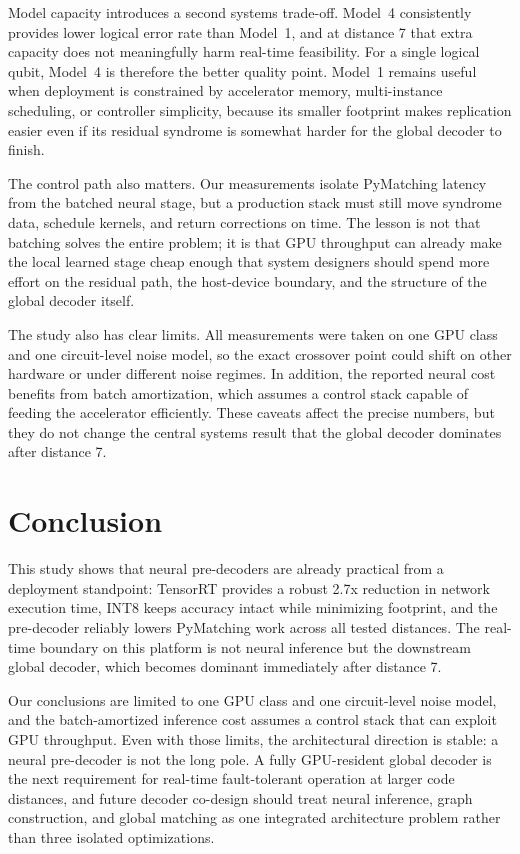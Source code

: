 \documentclass[journal]{IEEEtran}
\begin{document}
Model capacity introduces a second systems trade-off. Model~4 consistently provides lower logical error rate than Model~1, and at distance 7 that extra capacity does not meaningfully harm real-time feasibility. For a single logical qubit, Model~4 is therefore the better quality point. Model~1 remains useful when deployment is constrained by accelerator memory, multi-instance scheduling, or controller simplicity, because its smaller footprint makes replication easier even if its residual syndrome is somewhat harder for the global decoder to finish.

The control path also matters. Our measurements isolate PyMatching latency from the batched neural stage, but a production stack must still move syndrome data, schedule kernels, and return corrections on time. The lesson is not that batching solves the entire problem; it is that GPU throughput can already make the local learned stage cheap enough that system designers should spend more effort on the residual path, the host-device boundary, and the structure of the global decoder itself.

The study also has clear limits. All measurements were taken on one GPU class and one circuit-level noise model, so the exact crossover point could shift on other hardware or under different noise regimes. In addition, the reported neural cost benefits from batch amortization, which assumes a control stack capable of feeding the accelerator efficiently. These caveats affect the precise numbers, but they do not change the central systems result that the global decoder dominates after distance 7.

\section{Conclusion}

This study shows that neural pre-decoders are already practical from a deployment standpoint: TensorRT provides a robust 2.7x reduction in network execution time, INT8 keeps accuracy intact while minimizing footprint, and the pre-decoder reliably lowers PyMatching work across all tested distances. The real-time boundary on this platform is not neural inference but the downstream global decoder, which becomes dominant immediately after distance 7.

Our conclusions are limited to one GPU class and one circuit-level noise model, and the batch-amortized inference cost assumes a control stack that can exploit GPU throughput. Even with those limits, the architectural direction is stable: a neural pre-decoder is not the long pole. A fully GPU-resident global decoder is the next requirement for real-time fault-tolerant operation at larger code distances, and future decoder co-design should treat neural inference, graph construction, and global matching as one integrated architecture problem rather than three isolated optimizations.



\end{document}
